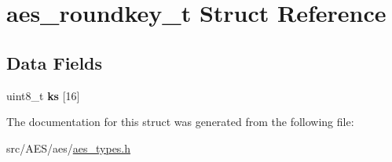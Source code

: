 \hypertarget{structaes__roundkey__t}{\section{aes\-\_\-roundkey\-\_\-t Struct Reference}
\label{structaes__roundkey__t}
}
\subsection*{Data Fields}
\begin{DoxyCompactItemize}
\item 
\hypertarget{structaes__roundkey__t_a9289449e3402751c6996e0c14c3750b8}{uint8\-\_\-t {\bfseries ks} \mbox{[}16\mbox{]}}\label{structaes__roundkey__t_a9289449e3402751c6996e0c14c3750b8}

\end{DoxyCompactItemize}


The documentation for this struct was generated from the following file\-:\begin{DoxyCompactItemize}
\item 
src/\-A\-E\-S/aes/\hyperlink{aes__types_8h}{aes\-\_\-types.\-h}\end{DoxyCompactItemize}
